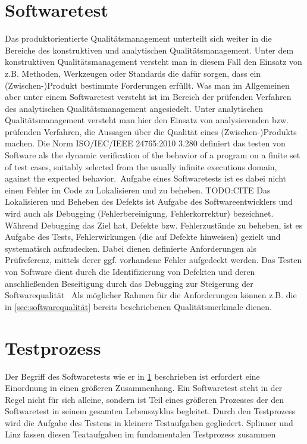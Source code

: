 \section{Softwaretest}
\label{sec:softwaretest}

Das produktorientierte Qualitätsmanagement unterteilt sich weiter in die Bereiche des konstruktiven und analytischen Qualitätsmanagement.
Unter dem konstruktiven Qualitätsmanagement versteht man in diesem Fall den Einsatz von z.B. Methoden, Werkzeugen oder Standards die dafür sorgen, dass ein (Zwischen-)Produkt bestimmte Forderungen erfüllt.
Was man im Allgemeinen aber unter einem Softwaretest versteht ist im Bereich der prüfenden Verfahren des analytischen Qualitätsmanagement angesiedelt.
Unter analytischen Qualitätsmanagement versteht man hier den Einsatz von analysierenden bzw. prüfenden Verfahren, die Aussagen über die Qualität eines (Zwischen-)Produkts machen. \newline
Die Norm ISO/IEC/IEEE 24765:2010 3.280 definiert das testen von Software als \glqq the dynamic verification of the behavior of a program on a finite set of test cases, suitably selected from the usually infinite executions domain, against the expected behavior.\grqq\
Aufgabe eines Softwaretests ist es dabei nicht einen Fehler im Code zu Lokalisieren und zu beheben. TODO:CITE
Das Lokalisieren und Beheben des Defekts ist Aufgabe des Softwareentwicklers und wird auch als Debugging (Fehlerbereinigung, Fehlerkorrektur) bezeichnet.
Während Debugging das Ziel hat, Defekte bzw. Fehlerzustände zu beheben, ist es Aufgabe des Tests, Fehlerwirkungen (die auf Defekte hinweisen) gezielt und systematisch aufzudecken. \cite{spillner_basiswissen_2007}
Dabei dienen definierte Anforderungen als Prüfreferenz, mittels derer ggf. vorhandene Fehler aufgedeckt werden.
\glqq Das Testen von Software dient durch die Identifizierung von Defekten und deren anschließenden Beseitigung durch das Debugging zur Steigerung der Softwarequalität\grqq\ \cite{spillner_basiswissen_2007}
Als möglicher Rahmen für die Anforderungen können z.B. die in \ref{sec:softwarequalität} bereits beschriebenen Qualitätsmerkmale dienen.


\section{Testprozess}
\label{sec:testprozess}

Der Begriff des Softwaretests wie er in \ref{sec:softwaretest} beschrieben ist erfordert eine Einordnung in einen größeren Zusammenhang. Ein Softwaretest steht in der Regel nicht für sich alleine, sondern ist Teil eines größeren Prozesses der den Softwaretest in seinem gesamten Lebenszyklus begleitet.
Durch den Testprozess wird die Aufgabe des Testens in kleinere Testaufgaben gegliedert.
Splinner und Linz fassen diesen Teataufgaben im fundamentalen Testprozess zusammen \cite{spillner_basiswissen_2007}


